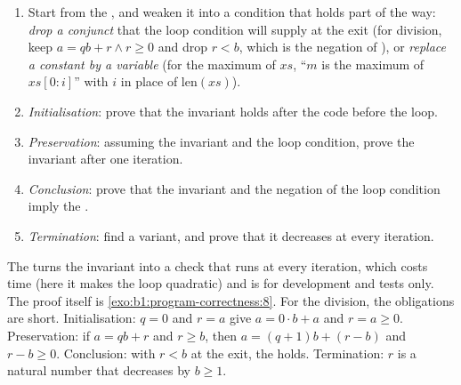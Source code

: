 \begin{method}\label{met:b1:program-correctness:invariant-method}
\begin{enumerate}
\item Start from the , and weaken it into a condition that holds part of the way: \emph{drop a conjunct}
that the loop condition will supply at the exit (for division, keep $a = qb + r \wedge r \geq 0$ and drop $r < b$, which
is the negation of ), or \emph{replace a constant by a variable} (for the maximum of $xs$, ``$m$ is the
maximum of $xs[0{:}i]$'' with $i$ in place of $\text{len}(xs)$).
\item \emph{Initialisation}: prove that the invariant holds after the code before the loop.
\item \emph{Preservation}: assuming the invariant and the loop condition, prove the invariant after one iteration.
\item \emph{Conclusion}: prove that the invariant and the negation of the loop condition imply the .
\item \emph{Termination}: find a variant, and prove that it decreases at every iteration.
\end{enumerate}
\end{method}

\label{lst:b1:program-correctness:maximum}

\label{out:b1:program-correctness:maximum}

The  turns the invariant into a check that runs at every iteration, which costs time (here it makes the loop
quadratic) and is for development and tests only. The proof itself is \cref{exo:b1:program-correctness:8}. For the
division, the obligations are short. Initialisation: $q = 0$ and $r = a$ give $a = 0 \cdot b + a$ and $r = a \geq 0$.
Preservation: if $a = qb + r$ and $r \geq b$, then $a = (q + 1)b + (r - b)$ and $r - b \geq 0$. Conclusion: with $r < b$
at the exit, the  holds. Termination: $r$ is a natural number that decreases by $b \geq 1$.

